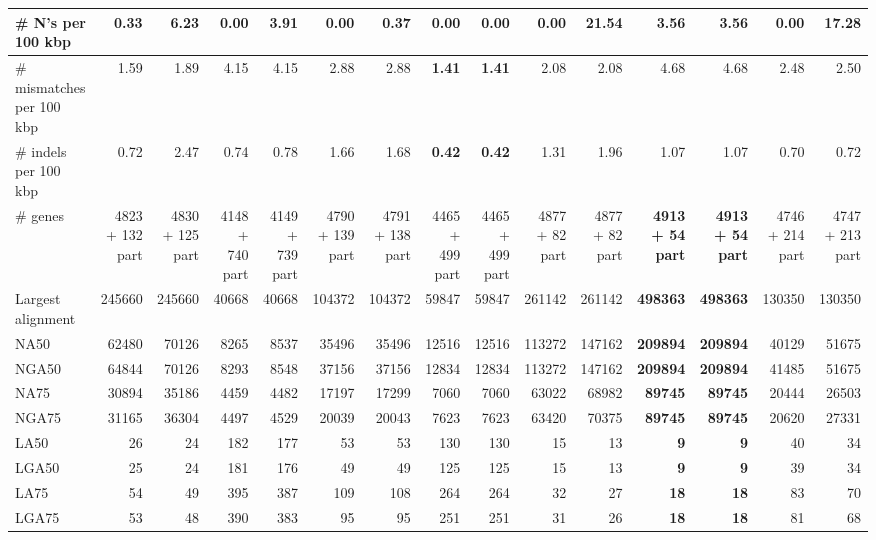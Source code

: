 \documentclass[12pt,a4paper]{article}
\begin{document}
\begin{table}[ht]
\begin{center}
\begin{tabular}{|l*{14}{|r}|}
\# N's per 100 kbp & 0.33 & 6.23 & {\bf 0.00} & 3.91 & {\bf 0.00} & 0.37 & {\bf 0.00} & {\bf 0.00} & {\bf 0.00} & 21.54 & 3.56 & 3.56 & {\bf 0.00} & 17.28 \\ \hline
\# mismatches per 100 kbp & 1.59 & 1.89 & 4.15 & 4.15 & 2.88 & 2.88 & {\bf 1.41} & {\bf 1.41} & 2.08 & 2.08 & 4.68 & 4.68 & 2.48 & 2.50 \\ \hline
\# indels per 100 kbp & 0.72 & 2.47 & 0.74 & 0.78 & 1.66 & 1.68 & {\bf 0.42} & {\bf 0.42} & 1.31 & 1.96 & 1.07 & 1.07 & 0.70 & 0.72 \\ \hline
\# genes & 4823 + 132 part & 4830 + 125 part & 4148 + 740 part & 4149 + 739 part & 4790 + 139 part & 4791 + 138 part & 4465 + 499 part & 4465 + 499 part & 4877 + 82 part & 4877 + 82 part & {\bf 4913 + 54 part} & {\bf 4913 + 54 part} & 4746 + 214 part & 4747 + 213 part \\ \hline
Largest alignment & 245660 & 245660 & 40668 & 40668 & 104372 & 104372 & 59847 & 59847 & 261142 & 261142 & {\bf 498363} & {\bf 498363} & 130350 & 130350 \\ \hline
NA50 & 62480 & 70126 & 8265 & 8537 & 35496 & 35496 & 12516 & 12516 & 113272 & 147162 & {\bf 209894} & {\bf 209894} & 40129 & 51675 \\ \hline
NGA50 & 64844 & 70126 & 8293 & 8548 & 37156 & 37156 & 12834 & 12834 & 113272 & 147162 & {\bf 209894} & {\bf 209894} & 41485 & 51675 \\ \hline
NA75 & 30894 & 35186 & 4459 & 4482 & 17197 & 17299 & 7060 & 7060 & 63022 & 68982 & {\bf 89745} & {\bf 89745} & 20444 & 26503 \\ \hline
NGA75 & 31165 & 36304 & 4497 & 4529 & 20039 & 20043 & 7623 & 7623 & 63420 & 70375 & {\bf 89745} & {\bf 89745} & 20620 & 27331 \\ \hline
LA50 & 26 & 24 & 182 & 177 & 53 & 53 & 130 & 130 & 15 & 13 & {\bf 9} & {\bf 9} & 40 & 34 \\ \hline
LGA50 & 25 & 24 & 181 & 176 & 49 & 49 & 125 & 125 & 15 & 13 & {\bf 9} & {\bf 9} & 39 & 34 \\ \hline
LA75 & 54 & 49 & 395 & 387 & 109 & 108 & 264 & 264 & 32 & 27 & {\bf 18} & {\bf 18} & 83 & 70 \\ \hline
LGA75 & 53 & 48 & 390 & 383 & 95 & 95 & 251 & 251 & 31 & 26 & {\bf 18} & {\bf 18} & 81 & 68 \\ \hline
\end{tabular}
\end{center}
\end{table}
\end{document}
